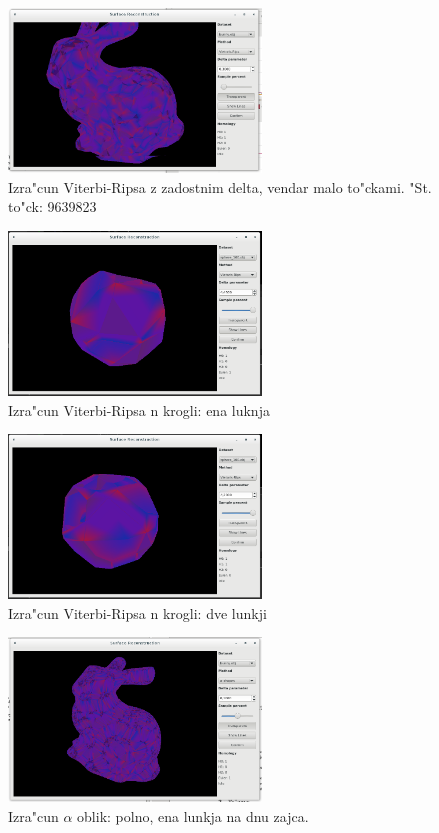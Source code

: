 \documentclass[11pt]{article}
\begin{document}
\begin{figure}[htb]
    \centering
    \includegraphics[width=0.6\textwidth]{vr_full_9639823.png}
    \caption{Izra"cun Viterbi-Ripsa z zadostnim delta, vendar malo to"ckami. "St. to"ck: 9639823}
    \label{fig:vr2}
\end{figure}

\begin{figure}[htb]
    \centering
    \includegraphics[width=0.6\textwidth]{vr_1hole.png}
    \caption{Izra"cun Viterbi-Ripsa n krogli: ena luknja}
    \label{fig:vr3}
\end{figure}

\begin{figure}[htb]
    \centering
    \includegraphics[width=0.6\textwidth]{vr_2hole.png}
    \caption{Izra"cun Viterbi-Ripsa n krogli: dve lunkji}
    \label{fig:vr4}
\end{figure}

\begin{figure}[htb]
    \centering
    \includegraphics[width=0.6\textwidth]{alpha_full.png}
    \caption{Izra"cun $\alpha$ oblik: polno, ena lunkja na dnu zajca.}
    \label{fig:a1}
\end{figure}
\end{document}
